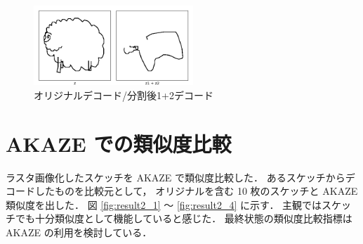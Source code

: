\documentclass[onecolumn]{ujarticle}   %
\begin{document}
\begin{figure}[th]
  \begin{center}
    \includegraphics[clip,width=60mm]{sketch_trained_split_6_rec.png}
    \caption{オリジナルデコード/分割後1+2デコード}
    \label{fig:result1_2}
  \end{center}
\end{figure}


\section{AKAZE での類似度比較}
ラスタ画像化したスケッチを AKAZE で類似度比較した．
あるスケッチからデコードしたものを比較元として，
オリジナルを含む 10 枚のスケッチと AKAZE 類似度を出した．
図 \ref{fig:result2_1} ～ \ref{fig:result2_4} に示す．
主観ではスケッチでも十分類似度として機能していると感じた．
最終状態の類似度比較指標は AKAZE の利用を検討している．
\end{document}
